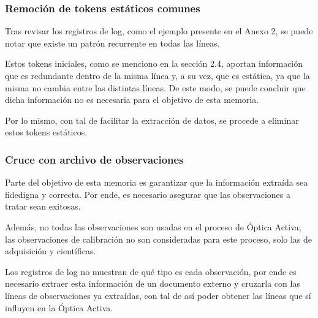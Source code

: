\subsubsection{Remoción de tokens estáticos comunes}

Tras revisar los registros de log, como el ejemplo presente en el Anexo 2, se puede notar que existe un patrón recurrente en todas las líneas.

Estos tokens iniciales, como se menciono en la sección 2.4, aportan información que es redundante dentro de la misma línea y, a su vez, que es estática, ya que la misma no cambia entre las distintas líneas. De este modo, se puede concluir que dicha información no es necesaria para el objetivo de esta memoria.

Por lo mismo, con tal de facilitar la extracción de datos, se procede a eliminar estos tokens estáticos.

\subsubsection{Cruce con archivo de observaciones}

Parte del objetivo de esta memoria es garantizar que la información extraída sea fidedigna y correcta. Por ende, es necesario asegurar que las observaciones a tratar sean exitosas.

Además, no todas las observaciones son usadas en el proceso de Óptica Activa; las observaciones de calibración no son consideradas para este proceso, solo las de adquisición y científicas.

Los registros de log no muestran de qué tipo es cada observación, por ende es necesario extraer esta información de un documento externo y cruzarla con las líneas de observaciones ya extraídas, con tal de así poder obtener las líneas que sí influyen en la Óptica Activa.


